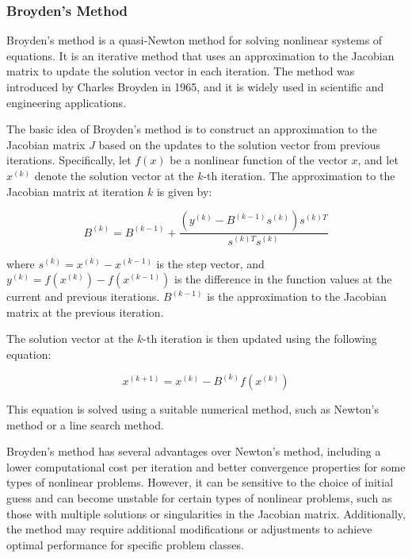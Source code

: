 \subsubsection{Broyden's Method}
\label{subsubsec:broyden_method}


Broyden's method is a quasi-Newton method for solving nonlinear systems of equations. It is an iterative method that uses an approximation to the Jacobian matrix to update the solution vector in each iteration. The method was introduced by Charles Broyden in 1965, and it is widely used in scientific and engineering applications.

The basic idea of Broyden's method is to construct an approximation to the Jacobian matrix $J$ based on the updates to the solution vector from previous iterations. Specifically, let $f(x)$ be a nonlinear function of the vector $x$, and let $x^{(k)}$ denote the solution vector at the $k$-th iteration. The approximation to the Jacobian matrix at iteration $k$ is given by:

\begin{equation}
  B^{(k)} = B^{(k-1)} + \frac{(y^{(k)} - B^{(k-1)}s^{(k)})s^{(k)T}}{s^{(k)T}s^{(k)}}
\end{equation}

where $s^{(k)} = x^{(k)} - x^{(k-1)}$ is the step vector, and $y^{(k)} = f(x^{(k)}) - f(x^{(k-1)})$ is the difference in the function values at the current and previous iterations. $B^{(k-1)}$ is the approximation to the Jacobian matrix at the previous iteration.

The solution vector at the $k$-th iteration is then updated using the following equation:

\begin{equation}
  x^{(k+1)} = x^{(k)} - B^{(k)}f(x^{(k)})
\end{equation}

This equation is solved using a suitable numerical method, such as Newton's method or a line search method.

Broyden's method has several advantages over Newton's method, including a lower computational cost per iteration and better convergence properties for some types of nonlinear problems. However, it can be sensitive to the choice of initial guess and can become unstable for certain types of nonlinear problems, such as those with multiple solutions or singularities in the Jacobian matrix. Additionally, the method may require additional modifications or adjustments to achieve optimal performance for specific problem classes.

